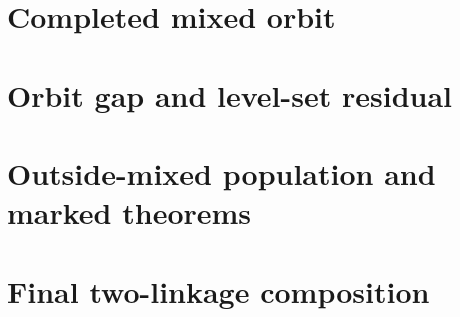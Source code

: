 \documentclass[10pt]{article}
\theoremstyle{definition}
\theoremstyle{remark}
\begin{document}
\part{Completed mixed orbit}


\part{Orbit gap and level-set residual}








\part{Outside-mixed population and marked theorems}








\part{Final two-linkage composition}


\end{document}
